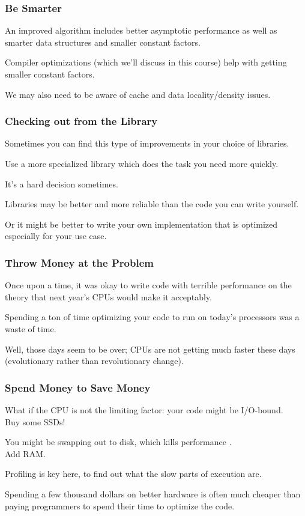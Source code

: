 \begin{frame}
\frametitle{Be Smarter}

An improved algorithm includes better asymptotic performance
as well as smarter data structures and smaller constant factors.


Compiler optimizations (which we'll discuss in this course) help with
getting smaller constant factors. 

We may also need to be aware of cache
and data locality/density issues.

\end{frame}



\begin{frame}
\frametitle{Checking out from the Library}

Sometimes you can find this type of improvements in your choice of
libraries.

Use a more specialized library which does the
task you need more quickly.
 
It's a hard decision sometimes. 

Libraries may be better and more reliable than the code you can write yourself. 

Or it might be better to write your own implementation that is optimized especially for your use case.

\end{frame}



\begin{frame}
\frametitle{Throw Money at the Problem}

Once upon a time, it was okay to write code with terrible performance on the theory that next year's CPUs would make it acceptably. 

Spending a ton of time optimizing your code to run on today's processors was a waste of time. 

Well, those days seem to be over; CPUs are not getting much faster these days (evolutionary rather than revolutionary change). 





\end{frame}



\begin{frame}
\frametitle{Spend Money to Save Money}

What if the CPU is not the limiting factor: your code might be I/O-bound.\\
\quad Buy some SSDs! 

You might be swapping out to disk, which kills performance .\\
\quad Add RAM. 

Profiling is key here, to find out what the slow parts of execution are. 

Spending a few thousand dollars on better hardware is often much cheaper than paying programmers to spend their time to optimize the code.


\end{frame}




